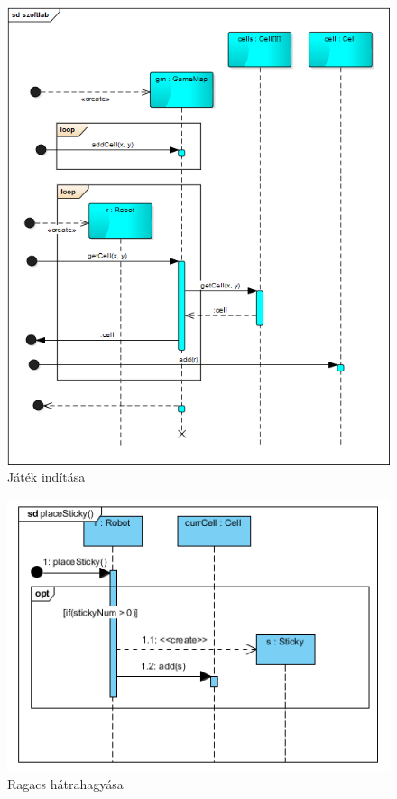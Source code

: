 \begin{figure}[!htbp]
	\begin{center}
		\includegraphics[width=166mm, center]{./vegleges_statikus_seq/game_map.png}
		\caption{Játék indítása}
	\end{center}
\end{figure}



\begin{figure}[!htbp]
	\begin{center}
		\includegraphics[width=166mm, center]{./vegleges_statikus_seq/placesticky.png}
		\caption{Ragacs hátrahagyása}
	\end{center}
\end{figure}

